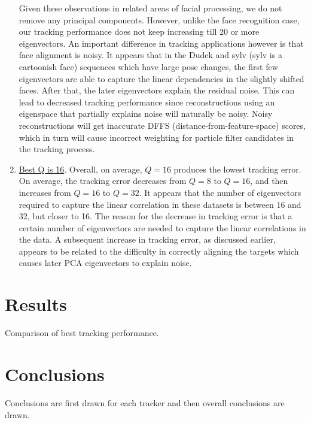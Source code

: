 \begin{enumerate}
Given these observations in related areas of facial processing, we do not remove any principal components.  However, unlike the face recognition case, our tracking performance does not keep increasing till 20 or more eigenvectors.  An important difference in tracking applications however is that face alignment is noisy.  It appears that in the Dudek and sylv (sylv is a cartoonish face) sequences which have large pose changes, the first few eigenvectors are able to capture the linear dependencies in the slightly shifted faces.  After that, the later eigenvectors explain the residual noise.  This can lead to decreased tracking performance since reconstructions using an eigenspace that partially explains noise will naturally be noisy.  Noisy reconstructions will get inaccurate DFFS (distance-from-feature-space) scores, which in turn will cause incorrect weighting for particle filter candidates in the tracking process.
\item \underline{Best Q is 16}.  Overall, on average, $Q=16$ produces the lowest tracking error.  On average, the tracking error decreases from $Q=8$ to $Q=16$, and then increases from $Q=16$ to $Q=32$.  It appears that the number of eigenvectors required to capture the linear correlation in these datasets is between 16 and 32, but closer to 16.   
The reason for the decrease in tracking error is that a certain number of eigenvectors are needed to capture the linear correlations in the data.  A subsequent increase in tracking error, as discussed earlier, appears to be related to the difficulty in correctly aligning the targets which causes later PCA eigenvectors to explain noise.
\end{enumerate}

\section{Results}
\begin{table}[h!]
\centering

\caption{Comparison of best tracking performance.}
\label{fig:Table_1__best}
\end{table}



\section{Conclusions}
Conclusions are first drawn for each tracker and then overall conclusions are drawn.

